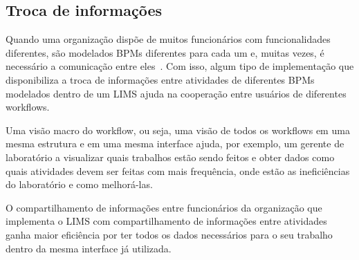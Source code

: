 \subsection{Troca de informações}


Quando uma organização dispõe de muitos funcionários com funcionalidades diferentes, são modelados BPMs diferentes para cada um e, muitas vezes, é necessário a comunicação entre eles~\cite{Holbein1996AOrganisations}. Com isso, algum tipo de implementação que disponibiliza a troca de informações entre atividades de diferentes BPMs modelados dentro de um LIMS ajuda na cooperação entre usuários de diferentes workflows.






Uma visão macro do workflow, ou seja, uma visão de todos os workflows em uma mesma estrutura e em uma mesma interface ajuda, por exemplo, um gerente de laboratório a visualizar quais trabalhos estão sendo feitos e obter dados como quais atividades devem ser feitas com mais frequência, onde estão as ineficiências do laboratório e como melhorá-las.

O compartilhamento de informações entre funcionários da organização que implementa o LIMS com compartilhamento de informações entre atividades ganha maior eficiência por ter todos os dados necessários para o seu trabalho dentro da mesma interface já utilizada.

